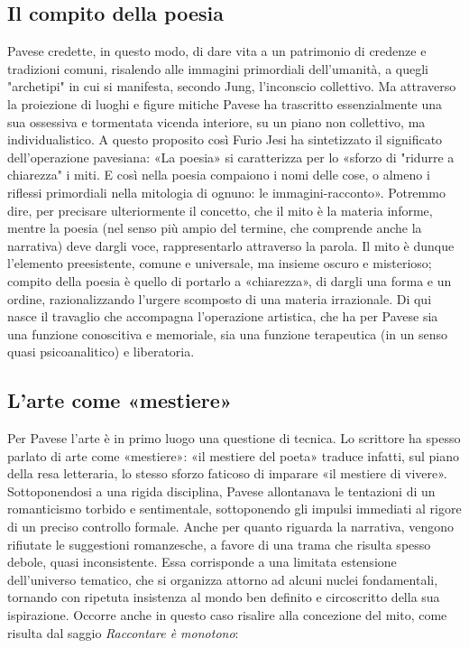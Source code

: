\documentclass[a4paper, twoside, titlepage]{book}
\begin{document}
\subsection{Il compito della poesia}

Pavese credette, in questo modo, di dare vita a un patrimonio di credenze e tradizioni comuni, risalendo alle immagini primordiali dell'umanità, a quegli "archetipi" in cui si manifesta, secondo Jung, l'inconscio collettivo. Ma attraverso la proiezione di luoghi e figure mitiche Pavese ha trascritto essenzialmente una sua ossessiva e tormentata vicenda interiore, su un piano non collettivo, ma individualistico. A questo proposito così Furio Jesi ha sintetizzato il significato dell'operazione pavesiana: «La poesia» si caratterizza per lo «sforzo di "ridurre a chiarezza" i miti. E così nella poesia compaiono i nomi delle cose, o almeno i riflessi primordiali nella mitologia di ognuno: le immagini-racconto». Potremmo dire, per precisare ulteriormente il concetto, che il mito è la materia informe, mentre la poesia (nel senso più ampio del termine, che comprende anche la narrativa) deve dargli voce, rappresentarlo attraverso la parola. Il mito è dunque l'elemento preesistente, comune e universale, ma insieme oscuro e misterioso; compito della poesia è quello di portarlo a «chiarezza», di dargli una forma e un ordine, razionalizzando l'urgere scomposto di una materia irrazionale. Di qui nasce il travaglio che accompagna l'operazione artistica, che ha per Pavese sia una funzione conoscitiva e memoriale, sia una funzione terapeutica (in un senso quasi psicoanalitico) e liberatoria.

\subsection{L'arte come «mestiere»}

Per Pavese l'arte è in primo luogo una questione di tecnica. Lo scrittore ha spesso parlato di arte come «mestiere»: «il mestiere del poeta» traduce infatti, sul piano della resa letteraria, lo stesso sforzo faticoso di imparare «il mestiere di vivere». Sottoponendosi a una rigida disciplina, Pavese allontanava le tentazioni di un romanticismo torbido e sentimentale, sottoponendo gli impulsi immediati al rigore di un preciso controllo formale. Anche per quanto riguarda la narrativa, vengono rifiutate le suggestioni romanzesche, a favore di una trama che risulta spesso debole, quasi inconsistente. Essa corrisponde a una limitata estensione dell'universo tematico, che si organizza attorno ad alcuni nuclei fondamentali, tornando con ripetuta insistenza al mondo ben definito e circoscritto della sua ispirazione. Occorre anche in questo caso risalire alla concezione del mito, come risulta dal saggio \textit{Raccontare è monotono}:
\end{document}
